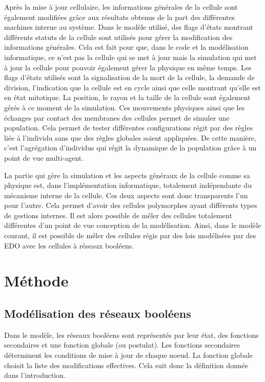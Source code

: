 \documentclass[11pt, a4paper]{article}
\begin{document}
Après la mise à jour cellulaire, les informations générales de la cellule sont
également modifiées grâce aux résultats obtenus de la part des différentes
machines interne au système.  Dans le modèle utilisé, des flags d'états
montrant différents statuts de la cellule sont utilisés pour gérer la
modification des informations générales. Cela est fait pour que, dans le code
et la modélisation informatique, ce n'est pas la cellule qui se met à jour mais
la simulation qui met à jour la cellule pour pouvoir également gérer la
physique en même temps.  Les flags d'états utilisés sont la signalisation de la
mort de la cellule, la demande de division, l'indication que la cellule est en
cycle ainsi que celle montrant qu'elle est en état mitotique. La position, le
rayon et la taille de la cellule sont également gérés à ce moment de la
simulation.  Ces mouvements physiques ainsi que les échanges par contact des
membranes des cellules permet de simuler une population. Cela permet de tester
différentes configurations régit par des règles liée à l'individu sans que des
règles globales soient appliquées.  De cette manière, c'est l'agrégation
d'individus qui régit la dynamique de la population grâce à un point de vue
multi-agent.

La partie qui gère la simulation et les aspects généraux de la cellule comme sa
physique est, dans l'implémentation informatique, totalement indépendante du
mécanisme interne de la cellule.  Ces deux aspects sont donc transparents l'un
pour l'autre. Cela permet d'avoir des cellules polymorphes ayant différents
types de gestions internes. Il est alors possible de mêler des cellules
totalement différentes d'un point de vue conception de la modélisation.  Ainsi,
dans le modèle courant, il est possible de mêler des cellules régis par des
lois modélisées par des EDO avec les cellules à réseaux booléens.

\newpage
\section{Méthode}
\subsection{Modélisation des réseaux booléens}
Dans le modèle, les réseaux booléens sont représentés par leur état, des
fonctions secondaires et une fonction globale (ou postulat). Les fonctions secondaires
déterminent les conditions de mise à jour de chaque noeud. La fonction globale
choisit la liste des modifications effectives.  Cela suit donc la définition
donnée dans l'introduction.
\end{document}
